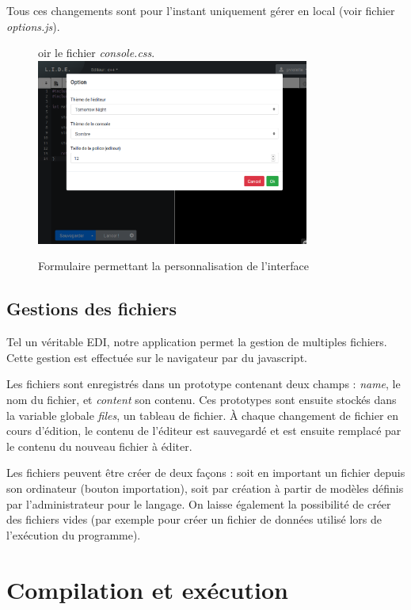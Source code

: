 Tous ces changements sont pour l'instant uniquement gérer en local (voir fichier \emph{options.js}).

\begin{figure}[!h]oir le fichier \emph{console.css}.
\centering
\includegraphics[width=0.8\textwidth]{./img/frontend/example_personnalisation.png}
\caption{Formulaire permettant la personnalisation de l'interface}
\end{figure}

\subsection{Gestions des fichiers}
Tel un véritable EDI, notre application permet la gestion de multiples fichiers. Cette gestion est effectuée sur le navigateur par du javascript.

Les fichiers sont enregistrés dans un prototype contenant deux champs : \emph{name}, le nom du fichier, et \emph{content} son contenu. Ces prototypes sont ensuite stockés dans la variable globale \emph{files}, un tableau de fichier. À chaque changement de fichier en cours d'édition, le contenu de l'éditeur est sauvegardé et est ensuite remplacé par le contenu du nouveau fichier à éditer.

Les fichiers peuvent être créer de deux façons : soit en important un fichier depuis son ordinateur (bouton importation), soit par création à partir de modèles définis par l'administrateur pour le langage.
On laisse également la possibilité de créer des fichiers vides (par exemple pour créer un fichier de données utilisé lors de l'exécution du programme).


\section{Compilation et exécution}

